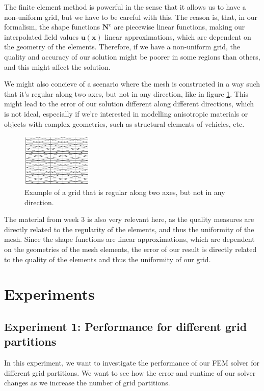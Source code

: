 \documentclass[acmtog]{acmart}
\begin{document}
The finite element method is powerful in the sense that it allows us to have a non-uniform grid, but we have to be careful with this. The reason is, that, in our formalism, the shape functions $\boldsymbol N^e$ are piecewise linear functions, making our interpolated field values $\boldsymbol u(\boldsymbol x)$ linear approximations, which are dependent on the geometry of the elements. Therefore, if we have a non-uniform grid, the quality and accuracy of our solution might be poorer in some regions than others, and this might affect the solution.

We might also concieve of a scenario where the mesh is constructed in a way such that it's regular along two axes, but not in any direction, like in figure \ref{fig:ani_grid}. This might lead to the error of our solution different along different directions, which is not ideal, especially if we're interested in modelling anisotropic materials or objects with complex geometries, such as structural elements of vehicles, etc.
%
\begin{figure}[H]
  \centering
  \includegraphics[width=0.3\textwidth]{Images/ani_grid.png}
  \caption{Example of a grid that is regular along two axes, but not in any direction.\label{fig:ani_grid}}
\end{figure}
%

The material from week 3 is also very relevant here, as the quality measures are directly related to the regularity of the elements, and thus the uniformity of the mesh. Since the shape functions are linear approximations, which are dependent on the geometries of the mesh elements, the error of our result is directly related to the quality of the elements and thus the uniformity of our grid.

\section{Experiments}
\subsection*{Experiment 1: Performance for different grid partitions}
In this experiment, we want to investigate the performance of our FEM solver for different grid partitions. We want to see how the error and runtime of our solver changes as we increase the number of grid partitions.
\end{document}
